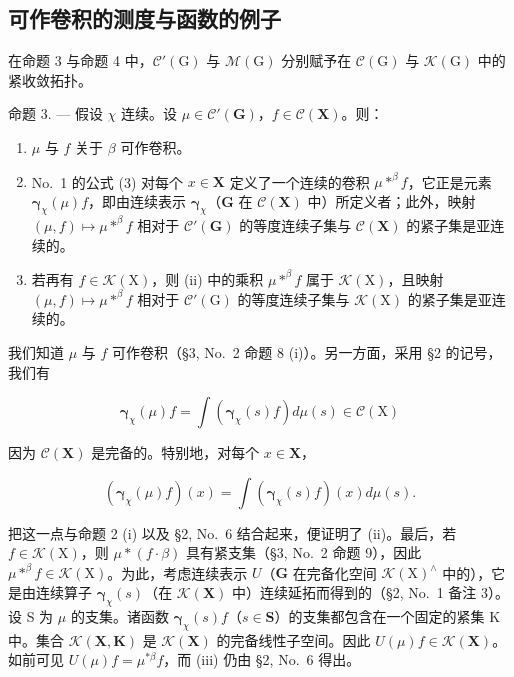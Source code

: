 \subsection{可作卷积的测度与函数的例子}

在命题 3 与命题 4 中，\(\mathcal{C}'(\mathrm{G})\) 与 \(\mathcal{M}(\mathrm{G})\) 分别赋予在 \(\mathcal{C}(\mathrm{G})\) 与 \(\mathcal{K}(\mathrm{G})\) 中的紧收敛拓扑。

命题 3. --- 假设 \(\chi\) 连续。设 \(\mu \in \mathcal{C}'(\mathbf{G})\)，\(f \in \mathcal{C}(\mathbf{X})\)。则：

\begin{enumerate}
\def\labelenumi{(\roman{enumi})}
\item
  \(\mu\) 与 \(f\) 关于 \(\beta\) 可作卷积。
\item
  No.~1 的公式 (3) 对每个 \(x \in \mathbf{X}\) 定义了一个连续的卷积 \(\mu *^{\beta}f\)，它正是元素 \(\pmb{\gamma}_{\chi}(\mu)f\)，即由连续表示 \(\pmb{\gamma}_{\chi}\)（\(\mathbf{G}\) 在 \(\mathcal{C}(\mathbf{X})\) 中）所定义者；此外，映射 \((\mu, f) \mapsto \mu *^{\beta}f\) 相对于 \(\mathcal{C}'(\mathbf{G})\) 的等度连续子集与 \(\mathcal{C}(\mathbf{X})\) 的紧子集是亚连续的。
\item
  若再有 \(f \in \mathcal{K}(\mathrm{X})\)，则 (ii) 中的乘积 \(\mu *^{\beta}f\) 属于 \(\mathcal{K}(\mathrm{X})\)，且映射 \((\mu, f) \mapsto \mu *^{\beta}f\) 相对于 \(\mathcal{C}'(\mathrm{G})\) 的等度连续子集与 \(\mathcal{K}(\mathrm{X})\) 的紧子集是亚连续的。
\end{enumerate}

我们知道 \(\mu\) 与 \(f\) 可作卷积（§3, No.~2 命题 8 (i)）。另一方面，采用 §2 的记号，我们有

\[
\boldsymbol {\gamma} _ {\chi} (\mu) f = \int \left(\boldsymbol {\gamma} _ {\chi} (s) f\right) d \mu (s) \in \mathcal {C} (\mathrm{X})
\]

因为 \(\mathcal{C}(\mathbf{X})\) 是完备的。特别地，对每个 \(x\in \mathbf{X}\)，

\[
\left(\boldsymbol {\gamma} _ {\chi} (\mu) f\right) (x) = \int \left(\boldsymbol {\gamma} _ {\chi} (s) f\right) (x) d \mu (s).
\]

把这一点与命题 2 (i) 以及 §2, No.~6 结合起来，便证明了 (ii)。最后，若 \(f \in \mathcal{K}(\mathrm{X})\)，则 \(\mu * (f \cdot \beta)\) 具有紧支集（§3, No.~2 命题 9），因此 \(\mu *^{\beta} f \in \mathcal{K}(\mathrm{X})\)。为此，考虑连续表示 \(U\)（\(\mathbf{G}\) 在完备化空间 \(\mathcal{K}(\mathrm{X})^{\wedge}\) 中的），它是由连续算子 \(\pmb{\gamma}_{\chi}(s)\)（在 \(\mathcal{K}(\mathbf{X})\) 中）连续延拓而得到的（§2, No.~1 备注 3）。设 S 为 \(\mu\) 的支集。诸函数 \(\pmb{\gamma}_{\chi}(s)f\)（\(s \in \mathbf{S}\)）的支集都包含在一个固定的紧集 K 中。集合 \(\mathcal{K}(\mathbf{X}, \mathbf{K})\) 是 \(\mathcal{K}(\mathbf{X})\) 的完备线性子空间。因此 \(U(\mu)f \in \mathcal{K}(\mathbf{X})\)。如前可见 \(U(\mu)f = \mu^{*\beta}f\)，而 (iii) 仍由 §2, No.~6 得出。

